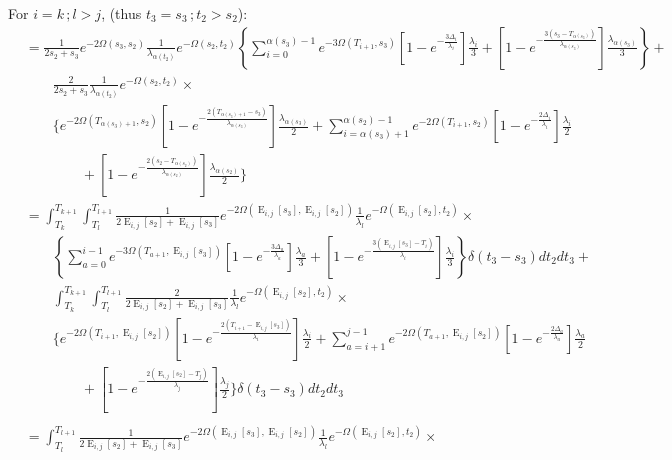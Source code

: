 \documentclass{article}
\DeclareMathOperator{\E}{E}
\begin{document}
For $i=k\,;l>j$, (thus $t_3=s_3\,;t_2>s_2$):
\begin{align*}
    &=\frac{1}{2s_2+s_3}e^{-2\Omega(s_3,s_2)}\frac{1}{\lambda_{\alpha(t_2)}}e^{-\Omega(s_2,t_2)}
    \left\{\sum_{i=0}^{\alpha(s_3)-1}e^{-3\Omega(T_{i+1},s_3)}
        \left[1-e^{-\frac{3\Delta_i}{\lambda_i}}\right]\frac{\lambda_i}{3}+
    \left[1-e^{-\frac{3\left(s_3-T_{\alpha(s_3)}\right)}{\lambda_{\alpha(s_3)}}}\right]
        \frac{\lambda_{\alpha(s_3)}}{3}\right\}+\\
    &\qquad\frac{2}{2s_2+s_3}\frac{1}{\lambda_{\alpha(t_2)}}e^{-\Omega(s_2,t_2)}\times\\
    &\qquad\Bigg\{e^{-2\Omega(T_{\alpha(s_3)+1},s_2)}\left[1-e^{-\frac{2\left(T_{\alpha(s_3)+1}-s_3\right)}{\lambda_{\alpha(s_3)}}}\right]\frac{\lambda_{\alpha(s_3)}}{2}+\sum_{i=\alpha(s_3)+1}^{\alpha(s_2)-1}e^{-2\Omega\left(T_{i+1},s_2\right)}\left[1-e^{-\frac{2\Delta_i}{\lambda_i}}\right]\frac{\lambda_i}{2}\\
    &\qquad\qquad+\left[1-e^{-\frac{2\left(s_2-T_{\alpha(s_2)}\right)}{\lambda_{\alpha(s_2)}}}\right]\frac{\lambda_{\alpha(s_2)}}{2}
    \Bigg\}
    \\
    &=\int_{T_k}^{T_{k+1}}\int_{T_l}^{T_{l+1}}\frac{1}{2\E_{i,j}[s_2]+\E_{i,j}[s_3]}e^{-2\Omega(\E_{i,j}[s_3],\E_{i,j}[s_2])}\frac{1}{\lambda_l}e^{-\Omega(\E_{i,j}[s_2],t_2)}\times\\
    &\qquad\left\{\sum_{a=0}^{i-1}e^{-3\Omega(T_{a+1},\E_{i,j}[s_3])}
        \left[1-e^{-\frac{3\Delta_a}{\lambda_a}}\right]\frac{\lambda_a}{3}+
    \left[1-e^{-\frac{3\left(\E_{i,j}[s_3]-T_i\right)}{\lambda_i}}\right]
    \frac{\lambda_i}{3}\right\}\delta(t_3-s_3)dt_2dt_3+\\
    &\qquad\int_{T_k}^{T_{k+1}}\int_{T_l}^{T_{l+1}}
        \frac{2}{2\E_{i,j}[s_2]+\E_{i,j}[s_3]}\frac{1}{\lambda_l}e^{-\Omega(\E_{i,j}[s_2],t_2)}\times\\
    &\qquad\Bigg\{e^{-2\Omega(T_{i+1},\E_{i,j}[s_2])}\left[1-e^{-\frac{2\left(T_{i+1}-\E_{i,j}[s_3]\right)}{\lambda_i}}\right]\frac{\lambda_i}{2}+\sum_{a=i+1}^{j-1}e^{-2\Omega\left(T_{a+1},\E_{i,j}[s_2]\right)}\left[1-e^{-\frac{2\Delta_a}{\lambda_a}}\right]\frac{\lambda_a}{2}\\
    &\qquad\qquad+\left[1-e^{-\frac{2\left(\E_{i,j}[s_2]-T_j\right)}{\lambda_j}}\right]\frac{\lambda_j}{2}
    \Bigg\}\delta(t_3-s_3)dt_2dt_3\\
    \\
    &=\int_{T_l}^{T_{l+1}}\frac{1}{2\E_{i,j}[s_2]+\E_{i,j}[s_3]}e^{-2\Omega(\E_{i,j}[s_3],\E_{i,j}[s_2])}\frac{1}{\lambda_l}e^{-\Omega(\E_{i,j}[s_2],t_2)}\times\\

\end{align*}
\end{document}
